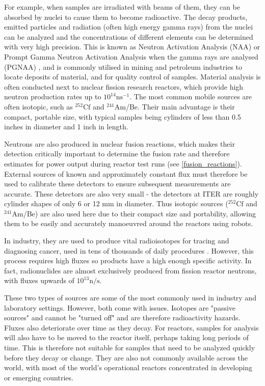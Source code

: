 \documentclass[a4paper,titlepage]{article}
\let\cite\parencite
\begin{document}
\begin{flushleft}
For example, when samples are irradiated with beams of them, they can be absorbed by nuclei to cause them to become radioactive. The decay products, emitted particles and radiation (often high energy gamma rays) from the nuclei can be analyzed and the concentrations of different elements can be determined with very high precision. This is known as Neutron Activation Analysis (NAA) or Prompt Gamma Neutron Activation Analysis when the gamma rays are analysed (PGNAA) \cite{iaea_2012_neutron}, and is commonly utilised in mining and petroleum industries to locate deposits of material, and for quality control of samples. \cite{nrodrguez_2015_determination} Material analysis is often conducted next to nuclear fission research reactors, which provide high neutron production rates up to $10^{14} \mathrm{ns}^{-1}$. The most common mobile sources are often isotopic, such as ${}^{252}\mathrm{Cf}$ and ${}^{241}\mathrm{Am}$/Be. Their main advantage is their compact, portable size, with typical samples being cylinders of less than 0.5 inches in diameter and 1 inch in length. \cite{qsaglobalinc_2025_cf252}

Neutrons are also produced in nuclear fusion reactions, which makes their detection critically important to determine the fusion rate and therefore estimates for power output during reactor test runs (see \ref{fusion_reactions}). External sources of known and approximately constant flux must therefore be used to calibrate these detectors to ensure subsequent measurements are accurate. These detectors are also very small - the detectors at ITER are roughly cylinder shapes of only 6 or 12 mm in diameter.\cite{ishikawa_2008_design} Thus isotopic sources (${}^{252}\mathrm{Cf}$ and ${}^{241}\mathrm{Am}$/Be) are also used here due to their compact size and portability, allowing them to be easily and accurately manoeuvred around the reactors using robots.\cite{snoj_2012_calculations} 

In industry, they are used to produce vital radioisotopes for tracing and diagnosing cancer, used in tens of thousands of daily procedures \cite{tc99mmo99ncib}. However, this process requires high fluxes so products have a high enough specific activity. In fact, radionuclides are almost exclusively produced from fission reactor neutrons, with fluxes upwards of $10^{13} \mathrm{n/s}$. \cite{elpezmelero_2024_production}

These two types of sources are some of the most commonly used in industry and laboratory settings. However, both come with issues. Isotopes are "passive sources" and cannot be "turned off" and are therefore radioactivity hazards. Fluxes also deteriorate over time as they decay. For reactors, samples for analysis will also have to be moved to the reactor itself, perhaps taking long periods of time. This is therefore not suitable for samples that need to be analyzed quickly before they decay or change. They are also not commonly available across the world, with most of the world's operational reactors concentrated in developing or emerging countries.


\end{flushleft}
\end{document}

